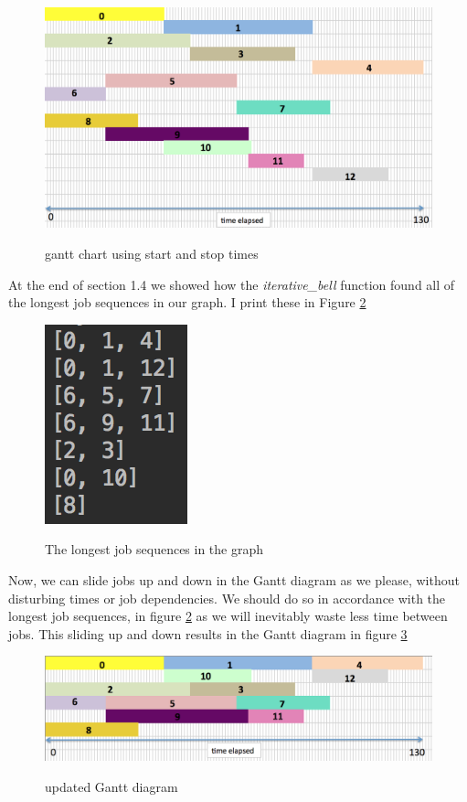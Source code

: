 \documentclass[paper=a4, fontsize=12pt]{scrartcl} %
\numberwithin{equation}{section}       %
\numberwithin{figure}{section}         %
\numberwithin{table}{section}          %
\begin{document}
\begin{figure}[h]
\caption{gantt chart using start and stop times}
\centering
\includegraphics[scale=0.6]{initial}\label{first}
\end{figure}

At the end of section 1.4 we showed how the \textit{iterative\_bell} function found all of the longest job sequences in our graph. I print these in Figure \ref{second}

\begin{figure}[h]
\caption{The longest job sequences in the graph}
\centering
\includegraphics[scale=0.8]{longest}\label{second}
\end{figure}

Now, we can slide jobs up and down in the Gantt diagram as we please, without disturbing times or job dependencies. We should do so in accordance with the longest job sequences, in figure \ref{second} as we will inevitably waste less time between jobs. This sliding up and down results in the Gantt diagram in figure \ref{third}

\begin{figure}[h]
\caption{updated Gantt diagram}
\centering
\includegraphics[scale=0.6]{group}\label{third}
\end{figure}
\end{document}
